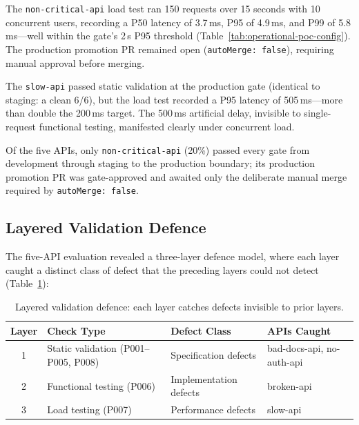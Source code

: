 The \texttt{non-critical-api} load test ran 150 requests over 15 seconds with 10 concurrent users, recording a P50 latency of 3.7\,ms, P95 of 4.9\,ms, and P99 of 5.8\,ms---well within the gate's 2\,s P95 threshold (Table~\ref{tab:operational-poc-config}). The production promotion PR remained open (\texttt{autoMerge: false}), requiring manual approval before merging.

The \texttt{slow-api} passed static validation at the production gate (identical to staging: a clean 6/6), but the load test recorded a P95 latency of 505\,ms---more than double the 200\,ms target. The 500\,ms artificial delay, invisible to single-request functional testing, manifested clearly under concurrent load.

Of the five APIs, only \texttt{non-critical-api} (20\%) passed every gate from development through staging to the production boundary; its production promotion PR was gate-approved and awaited only the deliberate manual merge required by \texttt{autoMerge: false}.

\subsection{Layered Validation Defence}
\label{subsec:layered-defence}

The five-API evaluation revealed a three-layer defence model, where each layer caught a distinct class of defect that the preceding layers could not detect (Table~\ref{tab:layered-defence}):

\begin{table}[htbp]
\centering
\caption{Layered validation defence: each layer catches defects invisible to prior layers.}
\label{tab:layered-defence}
\small
\begin{tabular}{@{}c p{} p{} p{}@{}}
\toprule
\textbf{Layer} & \textbf{Check Type} & \textbf{Defect Class} & \textbf{APIs Caught} \\
\midrule
1 & Static validation (P001--P005, P008) & Specification defects & bad-docs-api, no-auth-api \\
2 & Functional testing (P006)            & Implementation defects & broken-api \\
3 & Load testing (P007)                  & Performance defects    & slow-api \\
\bottomrule
\end{tabular}
\end{table}

